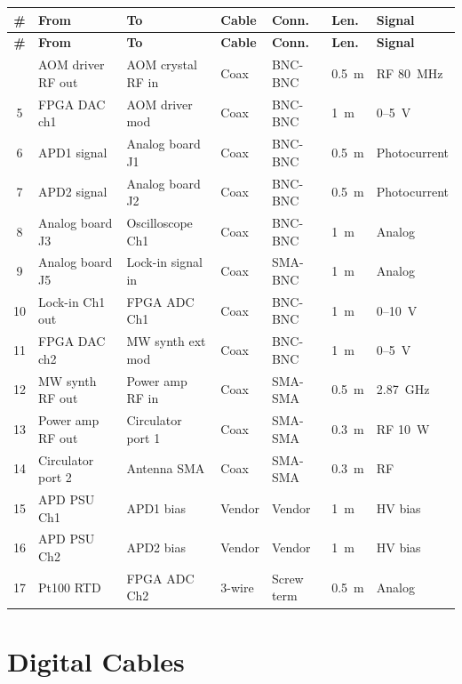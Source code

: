 \documentclass[11pt,a4paper,openany]{book}
\begin{document}
\begin{center}
\small
\begin{longtable}{clp{2cm}p{2cm}lll}
\toprule
\textbf{\#} & \textbf{From} & \textbf{To} & \textbf{Cable} & \textbf{Conn.} & \textbf{Len.} & \textbf{Signal} \\
\midrule
\endfirsthead
\toprule
\textbf{\#} & \textbf{From} & \textbf{To} & \textbf{Cable} & \textbf{Conn.} & \textbf{Len.} & \textbf{Signal} \\
\midrule
\endhead
\bottomrule
\endfoot
\bottomrule
\endlastfoot
4 & AOM driver RF out & AOM crystal RF in & Coax & BNC-BNC & 0.5~m & RF 80~MHz \\
5 & FPGA DAC ch1 & AOM driver mod & Coax & BNC-BNC & 1~m & 0--5~V \\
6 & APD1 signal & Analog board J1 & Coax & BNC-BNC & 0.5~m & Photocurrent \\
7 & APD2 signal & Analog board J2 & Coax & BNC-BNC & 0.5~m & Photocurrent \\
8 & Analog board J3 & Oscilloscope Ch1 & Coax & BNC-BNC & 1~m & Analog \\
9 & Analog board J5 & Lock-in signal in & Coax & SMA-BNC & 1~m & Analog \\
10 & Lock-in Ch1 out & FPGA ADC Ch1 & Coax & BNC-BNC & 1~m & 0--10~V \\
11 & FPGA DAC ch2 & MW synth ext mod & Coax & BNC-BNC & 1~m & 0--5~V \\
12 & MW synth RF out & Power amp RF in & Coax & SMA-SMA & 0.5~m & 2.87~GHz \\
13 & Power amp RF out & Circulator port 1 & Coax & SMA-SMA & 0.3~m & RF 10~W \\
14 & Circulator port 2 & Antenna SMA & Coax & SMA-SMA & 0.3~m & RF \\
15 & APD PSU Ch1 & APD1 bias & Vendor & Vendor & 1~m & HV bias \\
16 & APD PSU Ch2 & APD2 bias & Vendor & Vendor & 1~m & HV bias \\
17 & Pt100 RTD & FPGA ADC Ch2 & 3-wire & Screw term & 0.5~m & Analog \\
\end{longtable}
\end{center}

\section{Digital Cables}
\end{document}
